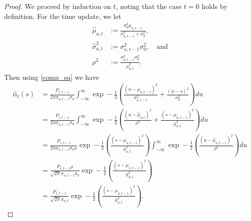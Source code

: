 \documentclass[12pt,leqno]{article}
\begin{document}
\begin{proof}

We proceed by induction on $t$, noting that the case $t = 0$ holds by definition.
For the time update, we let
\begin{align*}
  \hat{\mu}_{a,t} &:= \frac{\sigma_0^2\mu_{a,t-1}}{\sigma_{a,t-1}^2 + \sigma_0^2},\\
  \hat{\sigma}_{a,t}^2 &:=\sigma_{a,t-1}^2\sigma_0^2, \quad\text{and}\\
  \rho^2 &:= \frac{\sigma_{a,t-1}^2\sigma_0^2}{\hat{\sigma}_{a,t}^2}.
\end{align*}
Then using \eqref{comp_sq} we have 
\begin{equation}\label{alpha:2}
  \begin{split}
  \hat{\alpha}_t(s) &= \frac{P_{1,t-1}}{2\pi\sigma_{a,t-1}\sigma_0}
  \int_{-\infty}^{\infty}\exp-\frac{1}{2}\left(\frac{(u-\mu_{a,t-1})^2}{\sigma_{a,t-1}^2} + \frac{(u-s)^2}{\sigma_0^2}\right)du \\
  &= \frac{P_{1,t-1}}{2\pi\sigma_{a,t-1}\sigma_0}
  \int_{-\infty}^{\infty}\exp-\frac{1}{2}\left(\frac{(u-\hat{\mu}_{a,t})^2}{\rho^2} +
  \frac{(s - \mu_{a,t-1})^2}{\hat{\sigma}_{a,t}^2}\right)du \\
      &= \frac{P_{1,t-1}}{2\pi\sigma_{a,t-1}\sigma_0x} \exp-\frac{1}{2}\left(\frac{(s-\mu_{a,t-1})^2}{\hat{\sigma}_{a,t}^2}\right)
  \int_{-\infty}^{\infty}\exp-\frac{1}{2}\left(\frac{(u-\hat{\mu}_{a,t-1})^2}{\rho^2} \right)du \\
  &= \frac{P_{1,t-1}\rho}{\sqrt{2\pi}\sigma_{a,t-1}\sigma_0}\exp-\frac{1}{2}\left(\frac{(s-\mu_{a,t-1})^2}{\hat{\sigma}_{a,t}^2}\right)\\
  &= \frac{P_{1,t-1}}{\sqrt{2\pi}\hat{\sigma}_{a,t}}\exp-\frac{1}{2}\left(\frac{(s-\mu_{a,t-1})^2}{\hat{\sigma}_{a,t}^2}\right).
  \end{split}
  \end{equation}


\end{proof}
\end{document}
